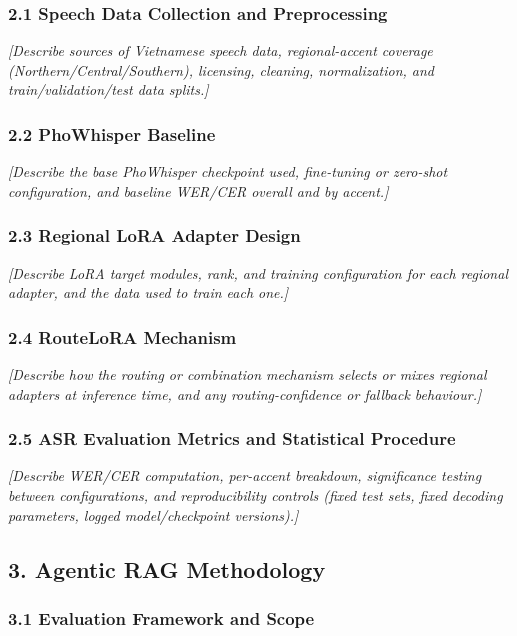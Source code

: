 \documentclass[11pt,a4paper]{article}
\newcommand{\guidance}[1]{%
  {\color{guidanceblue}\itshape [#1]\par}%
}
\begin{document}
\subsubsection{2.1 Speech Data Collection and Preprocessing}
\guidance{Describe sources of Vietnamese speech data, regional-accent
coverage (Northern/Central/Southern), licensing, cleaning, normalization, and
train/validation/test data splits.}

\subsubsection{2.2 PhoWhisper Baseline}
\guidance{Describe the base PhoWhisper checkpoint used, fine-tuning or
zero-shot configuration, and baseline WER/CER overall and by accent.}

\subsubsection{2.3 Regional LoRA Adapter Design}
\guidance{Describe LoRA target modules, rank, and training configuration for
each regional adapter, and the data used to train each one.}

\subsubsection{2.4 RouteLoRA Mechanism}
\guidance{Describe how the routing or combination mechanism selects or mixes
regional adapters at inference time, and any routing-confidence or
fallback behaviour.}

\subsubsection{2.5 ASR Evaluation Metrics and Statistical Procedure}
\guidance{Describe WER/CER computation, per-accent breakdown, significance
testing between configurations, and reproducibility controls (fixed test
sets, fixed decoding parameters, logged model/checkpoint versions).}

\subsection{3. Agentic RAG Methodology}

\subsubsection{3.1 Evaluation Framework and Scope}
\end{document}
